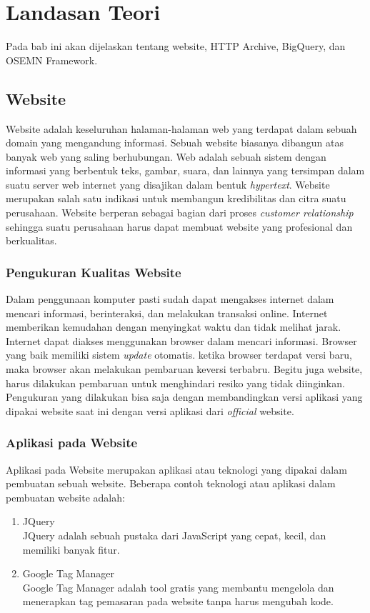 \chapter{Landasan Teori}
\label{chap:teori}
Pada bab ini akan dijelaskan tentang website, HTTP Archive, BigQuery, dan OSEMN Framework.
\section{Website}
\label{sec:website} 
Website adalah keseluruhan halaman-halaman web yang terdapat dalam sebuah domain yang mengandung informasi. Sebuah website biasanya dibangun atas banyak web yang saling berhubungan. Web adalah sebuah sistem dengan informasi yang berbentuk teks, gambar, suara, dan lainnya yang tersimpan dalam suatu server web internet yang disajikan dalam bentuk \textit{hypertext}. Website merupakan salah satu indikasi untuk membangun kredibilitas dan citra suatu perusahaan. Website berperan sebagai bagian dari proses \textit{customer relationship} sehingga suatu perusahaan harus dapat membuat website yang profesional dan berkualitas. 

\subsection{Pengukuran Kualitas Website}
Dalam penggunaan komputer pasti sudah dapat mengakses internet dalam mencari informasi, berinteraksi, dan melakukan transaksi online. Internet memberikan kemudahan dengan menyingkat waktu dan tidak melihat jarak. Internet dapat diakses menggunakan browser dalam mencari informasi. Browser yang baik memiliki sistem \textit{update} otomatis. ketika browser terdapat versi baru, maka browser akan melakukan pembaruan keversi terbabru. Begitu juga website, harus dilakukan pembaruan untuk menghindari resiko yang tidak diinginkan. Pengukuran yang dilakukan bisa saja dengan membandingkan versi aplikasi yang dipakai website saat ini dengan versi aplikasi dari \textit{official} website. 

\subsection{Aplikasi pada Website}
Aplikasi pada Website merupakan aplikasi atau teknologi yang dipakai dalam pembuatan sebuah website. Beberapa contoh teknologi atau aplikasi dalam pembuatan website adalah:
\begin{enumerate}
	\item JQuery\\
	JQuery adalah sebuah pustaka dari JavaScript yang cepat, kecil, dan memiliki banyak fitur. 
	\item Google Tag Manager\\
	Google Tag Manager adalah tool gratis yang membantu mengelola dan menerapkan tag pemasaran pada website tanpa harus mengubah kode.
\end{enumerate}


